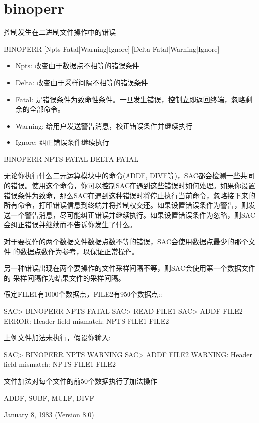 \section{binoperr}
\label{cmd:binoperr}

控制发生在二进制文件操作中的错误

BINOPERR [Npts Fatal|Warning|Ignore] [Delta Fatal|Warning|Ignore]

\begin{itemize}
\item Npts: 改变由于数据点不相等的错误条件 
\item Delta: 改变由于采样间隔不相等的错误条件 
\item Fatal: 是错误条件为致命性条件。一旦发生错误，控制立即返回终端，忽略剩余的全部命令。
\item Warning: 给用户发送警告消息，校正错误条件并继续执行
\item Ignore: 纠正错误条件继续执行
\end{itemize}

BINOPERR NPTS FATAL DELTA FATAL

无论你执行什么二元运算模块中的命令(ADDF, DIVF等)，SAC都会检测一些共同的错误。使用这个命令，你可以控制SAC在遇到这些错误时如何处理。如果你设置错误条件为致命，那么SAC在遇到这种错误时将停止执行当前命令，忽略接下来的所有命令，打印错误信息到终端并将控制权交还。如果设置错误条件为警告，则发送一个警告消息，尽可能纠正错误并继续执行。如果设置错误条件为忽略，则SAC会纠正错误并继续而不告诉你发生了什么。

对于要操作的两个数据文件数据点数不等的错误，SAC会使用数据点最少的那个文件	的数据点数作为参考，以保证正常操作。

另一种错误出现在两个要操作的文件采样间隔不等，则SAC会使用第一个数据文件的	采样间隔作为结果文件的采样间隔。

假定FILE1有1000个数据点，FILE2有950个数据点::
\begin{SACCode}
SAC> BINOPERR NPTS FATAL
SAC> READ FILE1
SAC> ADDF FILE2
ERROR:  Header field mismatch: NPTS FILE1 FILE2
\end{SACCode}
上例文件加法未执行，假设你输入:
\begin{SACCode}
SAC> BINOPERR NPTS WARNING
SAC> ADDF FILE2
WARNING:  Header field mismatch: NPTS FILE1 FILE2
\end{SACCode}
文件加法对每个文件的前50个数据执行了加法操作

ADDF, SUBF, MULF, DIVF

January 8, 1983 (Version 8.0)
